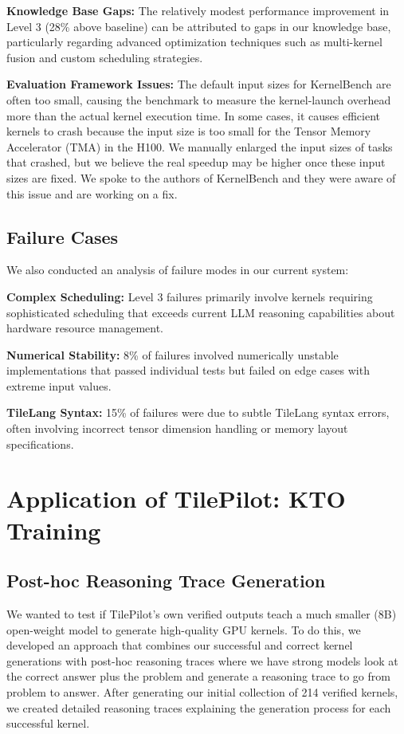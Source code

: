 \documentclass{article}
\begin{document}
\textbf{Knowledge Base Gaps:} The relatively modest performance improvement in Level 3 (28\% above baseline) can be attributed to gaps in our knowledge base, particularly regarding advanced optimization techniques such as multi-kernel fusion and custom scheduling strategies.

\textbf{Evaluation Framework Issues:} The default input sizes for KernelBench are often too small, causing the benchmark to measure the kernel-launch overhead more than the actual kernel execution time. In some cases, it causes efficient kernels to crash because the input size is too small for the Tensor Memory Accelerator (TMA) in the H100. We manually enlarged the input sizes of tasks that crashed, but we believe the real speedup may be higher once these input sizes are fixed. We spoke to the authors of KernelBench and they were aware of this issue and are working on a fix.

\subsection{Failure Cases}

We also conducted an analysis of failure modes in our current system:

\textbf{Complex Scheduling:} Level 3 failures primarily involve kernels requiring sophisticated scheduling that exceeds current LLM reasoning capabilities about hardware resource management.

\textbf{Numerical Stability:} 8\% of failures involved numerically unstable implementations that passed individual tests but failed on edge cases with extreme input values.

\textbf{TileLang Syntax:} 15\% of failures were due to subtle TileLang syntax errors, often involving incorrect tensor dimension handling or memory layout specifications.

\section{Application of TilePilot: KTO Training}

\subsection{Post-hoc Reasoning Trace Generation}

We wanted to test if TilePilot’s own verified outputs teach a much smaller (8B) open-weight model to generate high-quality GPU kernels. To do this, we developed an approach that combines our successful and correct kernel generations with post-hoc reasoning traces where we have strong models look at the correct answer plus the problem and generate a reasoning trace to go from problem to answer. After generating our initial collection of 214 verified kernels, we created detailed reasoning traces explaining the generation process for each successful kernel.
\end{document}

